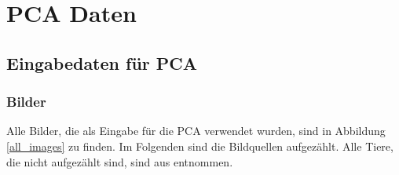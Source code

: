 \chapter{PCA Daten}
\label{appendix_pca}

\section{Eingabedaten für PCA}

\subsection{Bilder}
\label{picture_sources}
 
 Alle Bilder, die als Eingabe für die PCA verwendet wurden, sind in Abbildung \ref{all_images} zu finden. Im Folgenden sind die Bildquellen aufgezählt.
 Alle Tiere, die nicht aufgezählt sind, sind aus \cite{Spezielle_Zoologie} entnommen.
